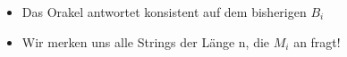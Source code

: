 \begin{frame}
\begin{columns}
	
	\begin{itemize}
	  \item Das Orakel antwortet konsistent auf dem bisherigen $B_i$
	  \item Wir merken uns alle Strings der L\"ange n, die $M_i$ an fragt!
	\end{itemize}
	\end{columns}
\end{frame}

